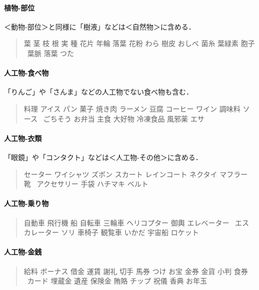 \documentclass[a4j,titlepage]{jarticle}
\begin{document}
\paragraph{植物-部位}

＜動物-部位＞と同様に「樹液」などは＜自然物＞に含める． 

\begin{quote}
葉 茎 枝 根 実 種 花片 年輪 落葉 花粉 わら 樹皮 おしべ 菌糸 葉緑素 胞子
\ 葉脈 落葉 つた
\end{quote}


\paragraph{人工物-食べ物}

「りんご」や「さんま」などの人工物でない食べ物も含む．

\begin{quote}
料理 アイス パン 菓子 焼き肉 ラーメン 豆腐 コーヒー ワイン 調味料 ソース
\ ごちそう お弁当 主食 大好物 冷凍食品 風邪薬 エサ
\end{quote}


\paragraph{人工物-衣類}

「眼鏡」や「コンタクト」などは＜人工物-その他＞に含める． 

\begin{quote}
セーター ワイシャツ ズボン スカート  レインコート ネクタイ マフラー 靴
\ アクセサリー 手袋 ハチマキ ベルト
\end{quote}


\paragraph{人工物-乗り物}

\begin{quote}
自動車 飛行機 船 自転車 三輪車 ヘリコプター 御輿 エレベーター 
\ エスカレーター ソリ 車椅子 観覧車 いかだ 宇宙船 ロケット
\end{quote}


\paragraph{人工物-金銭}

\begin{quote}
給料 ボーナス 借金 運賃 謝礼 切手 馬券 つけ お宝 金券 金貨 小判 食券 
\ カード 埋蔵金 遺産 保険金 賄賂 チップ 祝儀 香典 お年玉
\end{quote}
\end{document}
